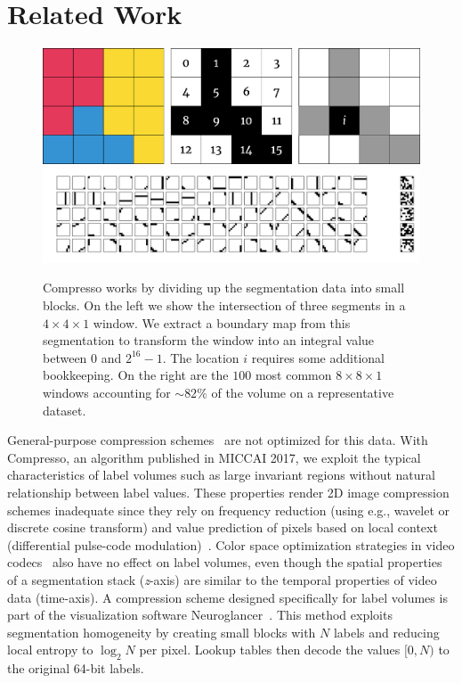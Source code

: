 \section{Related Work}

\begin{figure}[t]
	\begin{center}
		\includegraphics[width=0.45\linewidth]{./figures/encoding_diagram_opt.pdf}
		\hspace{0.08\linewidth}
		\includegraphics[width=0.45\linewidth]{./figures/window_values.pdf}
	\end{center}	
	\caption{Compresso works by dividing up the segmentation data into small blocks. On the left we show the intersection of three segments in a $4\times4\times1$ window. We extract a boundary map from this segmentation to transform the window into an integral value between $0$ and $2^{16} - 1$. The location $i$ requires some additional bookkeeping. On the right are the $100$ most common $8 \times 8 \times 1$ windows accounting for $\sim82\%$ of the volume on a representative dataset.}
	\label{fig:compression}
\end{figure}

General-purpose compression schemes~\cite{collet2016smaller,deutsch1996zlib,google2016brotli,lehmann2016liblzf,oberhumer2005lzo,pavlov2007lzma,seward1998bzip2,vandevenne2016zopfli,welch1984technique,ziv1978compression} are not optimized for this data.
With Compresso, an algorithm published in MICCAI 2017, we exploit the typical characteristics of label volumes such as large invariant regions without natural relationship between label values. 
These properties render 2D image compression schemes inadequate since they rely on frequency reduction (using e.g., wavelet or discrete cosine transform) and value prediction of pixels based on local context (differential pulse-code modulation)~\cite{roelofs1999png,skodras2001jpeg}. 
Color space optimization strategies in video codecs~\cite{aimar2005x264} also have no effect on label volumes, even though the spatial properties of a segmentation stack (\textit{z}-axis) are similar to the temporal properties of video data (time-axis). 
A compression scheme designed specifically for label volumes is part of the visualization software Neuroglancer~\cite{google2016compressed}. 
This method exploits segmentation homogeneity by creating small blocks with $N$ labels and reducing local entropy to $\log_2{N}$ per pixel. 
Lookup tables then decode the values $[0,N)$ to the original 64-bit labels.

